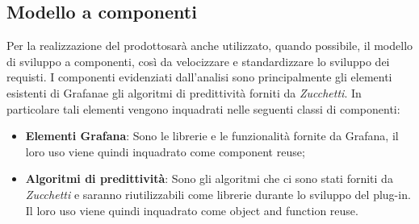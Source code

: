 \subsection{Modello a componenti}
Per la realizzazione del prodotto\glosp sarà anche utilizzato, quando possibile, il modello di sviluppo a componenti, così da velocizzare e standardizzare lo sviluppo dei requisti.
I componenti evidenziati dall'analisi sono principalmente gli elementi esistenti di Grafana\glosp e gli algoritmi di predittività forniti da \textit{Zucchetti}.
In particolare tali elementi vengono inquadrati nelle seguenti classi di componenti:
\begin{itemize}
	\item \textbf{Elementi Grafana}\glo: Sono le librerie e le funzionalità fornite da Grafana\glo, il loro uso viene quindi inquadrato come component reuse;
	\item \textbf{Algoritmi di predittività}: Sono gli algoritmi che ci sono stati forniti da \textit{Zucchetti} e saranno riutilizzabili come librerie durante lo sviluppo del plug-in. Il loro uso viene quindi inquadrato come object and function reuse.
\end{itemize}
